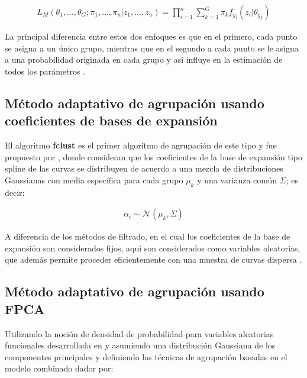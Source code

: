\documentclass[
]{book}
\begin{document}
\begin{align*}
    L_M(\theta_1,...,\theta_G;\pi_1,...,\pi_n|z_1,...,z_n)=\prod_{i=1}^n \sum_{k=1}^G\pi_k f_{y_i}(z_i|\theta_{y_k})
\end{align*}

La principal diferencia entre estos dos enfoques es que en el primero, cada punto se asigna a un único grupo, mientras que en el segundo a cada punto se le asigna a una probabilidad originada en cada grupo y así influye en la estimación de todos los parámetros \citep{sugar}.

\hypertarget{muxe9todo-adaptativo-de-agrupaciuxf3n-usando-coeficientes-de-bases-de-expansiuxf3n}{%
\subsection{Método adaptativo de agrupación usando coeficientes de bases de expansión}\label{muxe9todo-adaptativo-de-agrupaciuxf3n-usando-coeficientes-de-bases-de-expansiuxf3n}}

El algoritmo \textbf{fclust} es el primer algoritmo de agrupación de este tipo y fue propuesto por \citep{sugar}, donde consideran que los coeficientes de la base de expansión tipo spline de las curvas se distribuyen de acuerdo a una mezcla de distribuciones Gaussianas con media específica para cada grupo \(\mu_k\) y una varianza común \(\Sigma\); es decir:

\begin{align*}
    \alpha_i \sim \mathcal{N}(\mu_k,\Sigma)
\end{align*}

A diferencia de los métodos de filtrado, en el cual los coeficientes de la base de expansión son considerados fijos, aquí son considerados como variables aleatorias, que además permite proceder eficientemente con una muestra de curvas dispersa \citep{Jaque}.

\hypertarget{muxe9todo-adaptativo-de-agrupaciuxf3n-usando-fpca}{%
\subsection{Método adaptativo de agrupación usando FPCA}\label{muxe9todo-adaptativo-de-agrupaciuxf3n-usando-fpca}}

Utilizando la noción de densidad de probabilidad para variables aleatorias funcionales desarrollada en \citep{delagua} y asumiendo una distribución Gaussiana de los componentes principales y definiendo las técnicas de agrupación basadas en el modelo combinado dador por:
\end{document}
